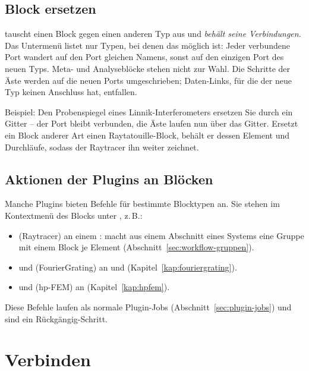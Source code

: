 \subsection{Block ersetzen}\label{sec:workflow-ersetzen}

 tauscht einen Block gegen einen anderen Typ aus und \emph{behält seine
Verbindungen}. Das Untermenü listet nur Typen, bei denen das möglich ist: Jeder verbundene Port
wandert auf den Port gleichen Namens, sonst auf den einzigen Port des neuen Typs. Meta- und
Analyseblöcke stehen nicht zur Wahl. Die Schritte der Äste werden auf die neuen Ports
umgeschrieben; Daten-Links, für die der neue Typ keinen Anschluss hat, entfallen.

Beispiel: Den Probenspiegel eines Linnik-Interferometers ersetzen Sie durch ein Gitter
 – der Port  bleibt verbunden, die Äste laufen nun über das Gitter.
Ersetzt ein Block anderer Art einen Raytatouille-Block, behält er dessen Element und
Durchläufe, sodass der Raytracer ihn weiter zeichnet.

\subsection{Aktionen der Plugins an Blöcken}

Manche Plugins bieten Befehle für bestimmte Blocktypen an. Sie stehen im Kontextmenü des Blocks
unter , z.\,B.:

\begin{itemize}
  \item {} (Raytracer) an einem : macht aus einem
        Abschnitt eines Systems eine Gruppe mit einem Block je Element
        (Abschnitt~\ref{sec:workflow-gruppen}).
  \item {} und 
        (FourierGrating) an  und 
        (Kapitel~\ref{kap:fouriergrating}).
  \item {} und  (hp-FEM) an
         (Kapitel~\ref{kap:hpfem}).
\end{itemize}

Diese Befehle laufen als normale Plugin-Jobs (Abschnitt~\ref{sec:plugin-jobs}) und sind ein
Rückgängig-Schritt.

\section{Verbinden}\label{sec:workflow-verbinden}

